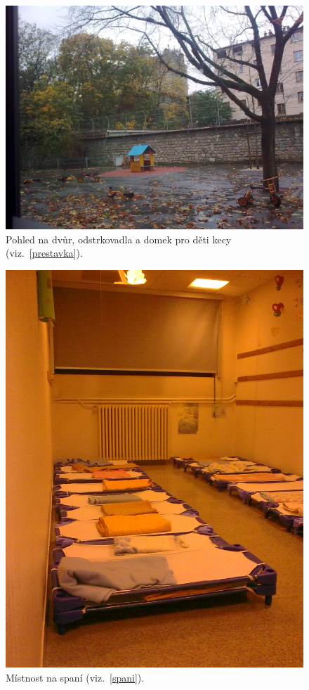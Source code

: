 	\begin{figure}[tb]
		\centering
		\includegraphics[height=0.35\textheight]{./fotky/Obr17.jpg}
		\caption{
			Pohled na dvůr, odstrkovadla a domek pro děti kecy (viz.~\ref{prestavka}).
		}
		\label{Obr17}
	\end{figure}

	\begin{figure}[tb]
		\centering
		\includegraphics[height=0.35\textheight]{./fotky/Obr18.jpg}
		\caption{
			Místnost na spaní (viz.~\ref{spani}).
		}
		\label{Obr18}
	\end{figure}
	
